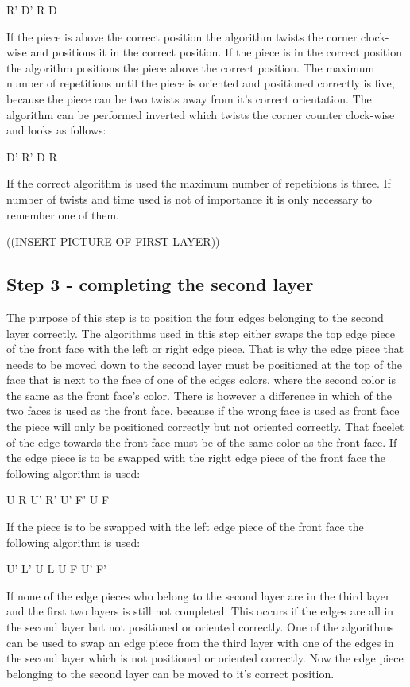 R' D' R D

If the piece is above the correct position the algorithm twists the corner clock-wise and positions it in the correct position. If the piece is in the correct position the algorithm positions the piece above the correct position. The maximum number of repetitions until the piece is oriented and positioned correctly is five, because the piece can be two twists away from it's correct orientation. 
The algorithm can be performed inverted which twists the corner counter clock-wise and looks as follows:

D' R' D R

If the correct algorithm is used the maximum number of repetitions is three. If number of twists and time used is not of importance it is only necessary to remember one of them.

((INSERT PICTURE OF FIRST LAYER))

\subsection{Step 3 - completing the second layer}
The purpose of this step is to position the four edges belonging to the second layer correctly. The algorithms used in this step either swaps the top edge piece of the front face with the left or right edge piece. That is why the edge piece that needs to be moved down to the second layer must be positioned at the top of the face that is next to the face of one of the edges colors, where the second color is the same as the front face's color. There is however a difference in which of the two faces is used as the front face, because if the wrong face is used as front face the piece will only be positioned correctly but not oriented correctly. That facelet of the edge towards the front face must be of the same color as the front face. If the edge piece is to be swapped with the right edge piece of the front face the following algorithm is used:

U R U' R' U' F' U F

If the piece is to be swapped with the left edge piece of the front face the following algorithm is used:

U' L' U L U F U' F'

If none of the edge pieces who belong to the second layer are in the third layer and the first two layers is still not completed. This occurs if the edges are all in the second layer but not positioned or oriented correctly. One of the algorithms can be used to swap an edge piece from the third layer with one of the edges in the second layer which is not positioned or oriented correctly. Now the edge piece belonging to the second layer can be moved to it's correct position.

